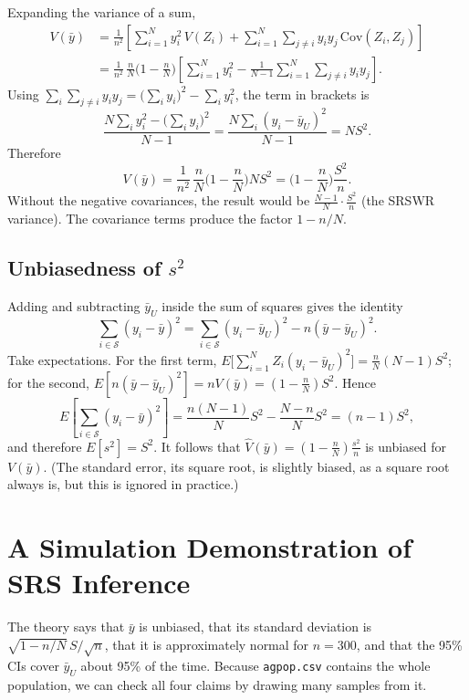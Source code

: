 \documentclass[
  letterpaper,
  DIV=11,
  numbers=noendperiod]{scrreprt}
\renewcommand{\[}{\begin{equation}}
\renewcommand{\]}{\end{equation}}
\begin{document}
Expanding the variance of a sum, \[
\begin{aligned}
V(\bar y) &= \frac{1}{n^2}\left[\sum_{i=1}^N y_i^2\, V(Z_i) + \sum_{i=1}^N\sum_{j\ne i} y_i y_j\,\mathrm{Cov}(Z_i,Z_j)\right] \\
 &= \frac{1}{n^2}\,\frac nN\Big(1-\frac nN\Big)\left[\sum_{i=1}^N y_i^2 - \frac{1}{N-1}\sum_{i=1}^N\sum_{j\ne i} y_i y_j\right].
\end{aligned}
\] Using
\(\sum_i\sum_{j\ne i} y_iy_j = \big(\sum_i y_i\big)^2 - \sum_i y_i^2\),
the term in brackets is \[
\frac{N\sum_{i} y_i^2 - \big(\sum_{i} y_i\big)^2}{N-1}
 = \frac{N\sum_i (y_i - \bar y_U)^2}{N-1} = N S^2 .
\] Therefore \[
V(\bar y) = \frac{1}{n^2}\,\frac nN\Big(1-\frac nN\Big) N S^2 = \Big(1-\frac nN\Big)\frac{S^2}{n}.
\] Without the negative covariances, the result would be
\(\frac{N-1}{N}\cdot\frac{S^2}{n}\) (the SRSWR variance). The covariance
terms produce the factor \(1 - n/N\).

\subsection{\texorpdfstring{Unbiasedness of
\(s^2\)}{Unbiasedness of s\^{}2}}\label{unbiasedness-of-s2}

Adding and subtracting \(\bar y_U\) inside the sum of squares gives the
identity \[
\sum_{i\in\mathcal S}(y_i-\bar y)^2 = \sum_{i\in\mathcal S}(y_i-\bar y_{U})^2 - n(\bar y - \bar y_U)^2 .
\] Take expectations. For the first term,
\(E\big[\sum_{i=1}^N Z_i(y_i-\bar y_U)^2\big] = \frac nN (N-1)S^2\); for
the second,
\(E[n(\bar y - \bar y_U)^2] = nV(\bar y) = (1-\frac nN)S^2\). Hence \[
E\left[\sum_{i\in\mathcal S}(y_i-\bar y)^2\right]
 = \frac{n(N-1)}{N}S^2 - \frac{N-n}{N}S^2 = (n-1)S^2 ,
\] and therefore \(E[s^2] = S^2\). It follows that
\(\hat V(\bar y) = (1-\frac nN)\frac{s^2}{n}\) is unbiased for
\(V(\bar y)\). (The standard error, its square root, is slightly biased,
as a square root always is, but this is ignored in practice.)

\section{A Simulation Demonstration of SRS
Inference}\label{sec-srs-simulation}

The theory says that \(\bar y\) is unbiased, that its standard deviation
is \(\sqrt{1-n/N}\,S/\sqrt n\), that it is approximately normal for
\(n = 300\), and that the 95\% CIs cover \(\bar y_U\) about 95\% of the
time. Because \texttt{agpop.csv} contains the whole population, we can
check all four claims by drawing many samples from it.
\end{document}
